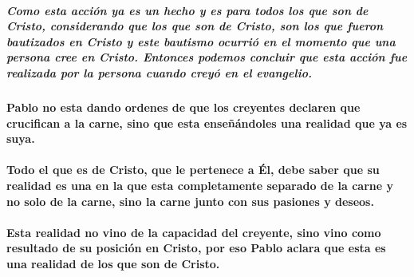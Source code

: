 \documentclass[11a pt,twoside]{article}
\def\textbf#1{#1}%
\let\oldparagraph\paragraph
\renewcommand{\paragraph}{\needspace{3\baselineskip}\oldparagraph}
\let\oldsubparagraph\subparagraph
\renewcommand{\subparagraph}{\needspace{2\baselineskip}\oldsubparagraph}
\begin{document}
\subparagraph{Como esta acción ya es un hecho y es para todos los que
son de Cristo, considerando que los que son de Cristo, son los que
fueron bautizados en Cristo y este bautismo ocurrió en el momento que
una persona cree en Cristo. Entonces podemos concluir que esta acción
fue realizada por la persona cuando creyó en el
evangelio.}\label{como-esta-acciuxf3n-ya-es-un-hecho-y-es-para-todos-los-que-son-de-cristo-considerando-que-los-que-son-de-cristo-son-los-que-fueron-bautizados-en-cristo-y-este-bautismo-ocurriuxf3-en-el-momento-que-una-persona-cree-en-cristo.-entonces-podemos-concluir-que-esta-acciuxf3n-fue-realizada-por-la-persona-cuando-creyuxf3-en-el-evangelio.}

\paragraph{Pablo no esta dando ordenes de que los creyentes declaren que
crucifican a la carne, sino que esta enseñándoles una realidad que ya es
suya.}\label{pablo-no-esta-dando-ordenes-de-que-los-creyentes-declaren-que-crucifican-a-la-carne-sino-que-esta-enseuxf1uxe1ndoles-una-realidad-que-ya-es-suya.}

\paragraph{Todo el que es de Cristo, que le pertenece a Él, debe saber
que su realidad es una en la que esta completamente separado de la carne
y no solo de la carne, sino la carne junto con sus pasiones y
deseos.}\label{todo-el-que-es-de-cristo-que-le-pertenece-a-uxe9l-debe-saber-que-su-realidad-es-una-en-la-que-esta-completamente-separado-de-la-carne-y-no-solo-de-la-carne-sino-la-carne-junto-con-sus-pasiones-y-deseos.}

\paragraph{\texorpdfstring{Esta realidad no vino de la capacidad del
creyente, sino vino como resultado de su posición en Cristo, por eso
Pablo aclara que esta es una realidad de los que \textbf{son} de
Cristo.}{Esta realidad no vino de la capacidad del creyente, sino vino como resultado de su posición en Cristo, por eso Pablo aclara que esta es una realidad de los que son de Cristo.}}\label{esta-realidad-no-vino-de-la-capacidad-del-creyente-sino-vino-como-resultado-de-su-posiciuxf3n-en-cristo-por-eso-pablo-aclara-que-esta-es-una-realidad-de-los-que-son-de-cristo.}
\end{document}
